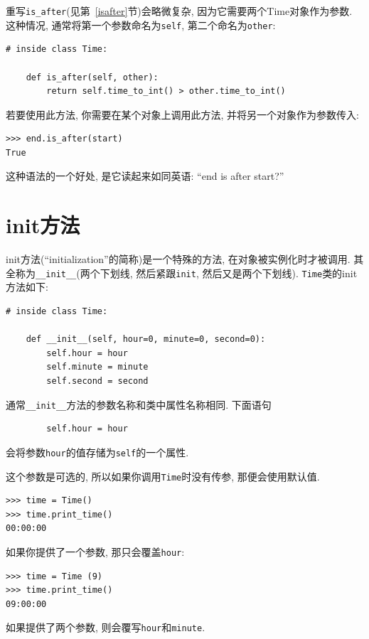 \documentclass[10pt]{book}
\begin{document}
重写\verb"is_after"(见第~\ref{isafter}节)会略微复杂, 因为它需要两个Time对象作为参数. 
这种情况, 通常将第一个参数命名为{\tt self}, 第二个命名为{\tt other}:

\begin{verbatim}
# inside class Time:

    def is_after(self, other):
        return self.time_to_int() > other.time_to_int()
\end{verbatim}
%
若要使用此方法, 你需要在某个对象上调用此方法, 并将另一个对象作为参数传入:

\begin{verbatim}
>>> end.is_after(start)
True
\end{verbatim}
%
这种语法的一个好处, 是它读起来如同英语: ``end is after start?''


\section{init方法}

init方法(``initialization''的简称)是一个特殊的方法, 
在对象被实例化时才被调用. 
其全称为\verb"__init__"(两个下划线, 然后紧跟{\tt init}, 然后又是两个下划线).
{\tt Time}类的init方法如下:

\begin{verbatim}
# inside class Time:

    def __init__(self, hour=0, minute=0, second=0):
        self.hour = hour
        self.minute = minute
        self.second = second
\end{verbatim}
%
通常\verb"__init__"方法的参数名称和类中属性名称相同. 
下面语句

\begin{verbatim}
        self.hour = hour
\end{verbatim}
%
会将参数{\tt hour}的值存储为{\tt self}的一个属性.

这个参数是可选的, 所以如果你调用{\tt Time}时没有传参, 
那便会使用默认值. 

\begin{verbatim}
>>> time = Time()
>>> time.print_time()
00:00:00
\end{verbatim}
%
如果你提供了一个参数, 那只会覆盖{\tt hour}:

\begin{verbatim}
>>> time = Time (9)
>>> time.print_time()
09:00:00
\end{verbatim}
%
如果提供了两个参数, 则会覆写{\tt hour}和{\tt minute}.
\end{document}
